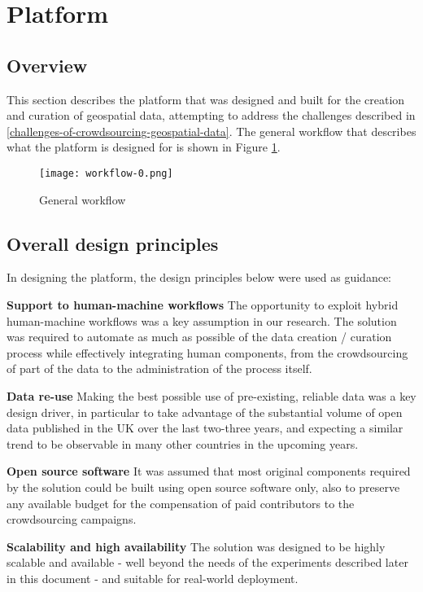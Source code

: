 \section{Platform}

\subsection{Overview}

This section describes the platform that was designed and built for the creation and curation of geospatial data, attempting to address the challenges described in \ref{challenges-of-crowdsourcing-geospatial-data}. The general workflow that describes what the platform is designed for is shown in Figure \ref{fig:workflow_0}.

\begin{figure}
	\texttt{[image: workflow-0.png]}
	\caption{General workflow}
	\label{fig:workflow_0}
\end{figure}

\subsection{Overall design principles}

In designing the platform, the design principles below were used as guidance:

\textbf{Support to human-machine workflows} The opportunity to exploit hybrid human-machine workflows was a key assumption in our research. The solution was required to automate as much as possible of the data creation / curation process while effectively integrating human components, from the crowdsourcing of part of the data to the administration of the process itself.

\textbf{Data re-use} Making the best possible use of pre-existing, reliable data was a key design driver, in particular to take advantage of the substantial volume of open data published in the UK over the last two-three years, and expecting a similar trend to be observable in many other countries in the upcoming years.

\textbf{Open source software} It was assumed that most original components required by the solution could be built using open source software only, also to preserve any available budget for the compensation of paid contributors to the crowdsourcing campaigns.

\textbf{Scalability and high availability} The solution was designed to be highly scalable and available - well beyond the needs of the experiments described later in this document - and suitable for real-world deployment.

